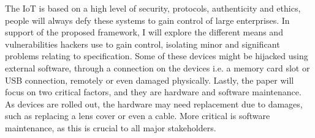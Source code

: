 \newline
\vspace{5mm} %
The IoT is based on a high level of security, protocols, authenticity and ethics, people will always defy these systems to gain control of large enterprises. In support of the proposed framework, I will explore the different means and vulnerabilities hackers use to gain control, isolating minor and significant problems relating to specification. Some of these devices might be hijacked using external software, through a connection on the devices i.e. a memory card slot or USB connection, remotely or even damaged physically. 
\newline
\vspace{5mm} %
Lastly, the paper will focus on two critical factors, and they are hardware and software maintenance. As devices are rolled out, the hardware may need replacement due to damages, such as replacing a lens cover or even a cable. More critical is software maintenance, as this is crucial to all major stakeholders. 
